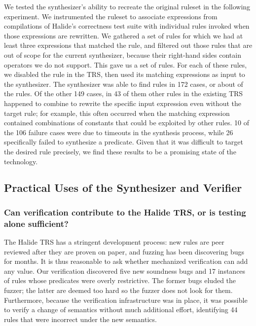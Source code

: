 \documentclass[acmsmall,review,anonymous]{acmart}\settopmatter{printfolios=true,printccs=false,printacmref=false}
\begin{document}
We tested the synthesizer's ability to recreate the original ruleset in the following experiment. We instrumented the ruleset to associate expressions from compilations of Halide's correctness test suite with individual rules invoked when those expressions are rewritten. We gathered a set of rules for which we had at least three expressions that matched the rule, and filtered out those rules that are out of scope for the current synthesizer, because their right-hand sides contain operators we do not support. This gave us a set of \NumRulesInCorrectnessExperiment{} rules. For each of these rules, we disabled the rule in the TRS, then used its matching expressions as input to the synthesizer. The synthesizer was able to find rules in 172 cases, or about \PercentRulesResynthesized{} of the rules. Of the other 149 cases, in 43 of them other rules in the existing TRS happened to combine to rewrite the specific input expression even without the target rule; for example, this often occurred when the matching expression contained combinations of constants that could be exploited by other rules. 10 of the 106 failure cases were due to timeouts in the synthesis process, while 26 specifically failed to synthesize a predicate. Given that it was difficult to target the desired rule precisely, we find these results to be a promising state of the technology.


\subsection{Practical Uses of the Synthesizer and Verifier}

\subsubsection{Can verification contribute to the Halide TRS, or is testing alone sufficient?}
\label{sec:eval-correctness}

The Halide TRS has a stringent development process: new rules are peer reviewed after they are proven on paper, and fuzzing has been discovering bugs for months. It is thus reasonable to ask whether mechanized verification can add any value. Our verification discovered five new soundness bugs and 17 instances of rules whose predicates were overly restrictive. The former bugs eluded the fuzzer; the latter are deemed too hard so the fuzzer does not look for them. Furthermore, because the verification infrastructure was in place, it was possible to verify a change of semantics without much additional effort, identifying 44 rules that were incorrect under the new semantics.
\end{document}
